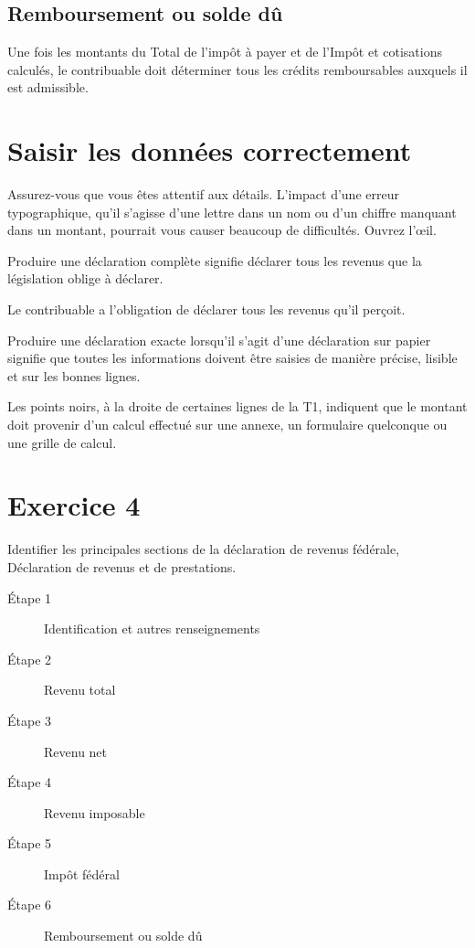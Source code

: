 \subsection{Remboursement ou solde dû}
Une fois les montants du \og Total de l'impôt à payer\fg{} \cat{} et de l'\og Impôt et cotisations \fg{}~\qct{} calculés, le contribuable doit déterminer tous les crédits remboursables auxquels il est admissible.



\section{Saisir les données correctement}
\begin{intro}
	Assurez-vous que vous êtes attentif aux détails. L'impact d'une erreur typographique, qu'il s'agisse d'une lettre dans un nom ou d'un chiffre manquant dans un montant, pourrait vous causer beaucoup de difficultés. Ouvrez l'œil.
\end{intro}
Produire une \og déclaration complète\fg{} signifie déclarer tous les revenus que la législation oblige à déclarer.

Le contribuable a l'obligation de déclarer tous les revenus qu'il perçoit.

Produire une déclaration exacte lorsqu'il s'agit d'une déclaration sur papier signifie que toutes les informations doivent être saisies de manière précise, lisible et sur les bonnes lignes.

Les points noirs, à la droite de certaines lignes de la T1, indiquent que le montant doit provenir d'un calcul effectué sur une annexe, un formulaire quelconque ou une grille de calcul.



\section{Exercice 4}
\setcounter{question}{0}
\begin{question}
	Identifier les principales sections de la déclaration de revenus fédérale, Déclaration de revenus et de prestations.
\end{question}
\begin{description}
	\item[Étape 1] Identification et autres renseignements
	\item[Étape 2] Revenu total
	\item[Étape 3] Revenu net
	\item[Étape 4] Revenu imposable
	\item[Étape 5] Impôt fédéral
	\item[Étape 6] Remboursement ou solde dû
\end{description}

